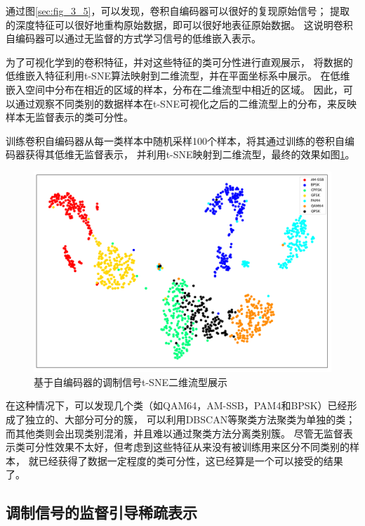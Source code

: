 通过图\ref{sec:fig_3_5}，可以发现，卷积自编码器可以很好的复现原始信号；
提取的深度特征可以很好地重构原始数据，即可以很好地表征原始数据。
这说明卷积自编码器可以通过无监督的方式学习信号的低维嵌入表示。\par

为了可视化学到的卷积特征，并对这些特征的类可分性进行直观展示，
将数据的低维嵌入特征利用t-SNE算法映射到二维流型，并在平面坐标系中展示。
在低维嵌入空间中分布在相近的区域的样本，分布在二维流型中相近的区域。
因此，可以通过观察不同类别的数据样本在t-SNE可视化之后的二维流型上的分布，来反映样本无监督表示的类可分性。\par

训练卷积自编码器从每一类样本中随机采样100个样本，将其通过训练的卷积自编码器获得其低维无监督表示，
并利用t-SNE映射到二维流型，最终的效果如图\ref{sec:fig_3_6}。

\begin{figure}[!h]
	\centering
	\includegraphics[scale=0.4]{figures/chapter_3/fig_3_6}
	\caption{基于自编码器的调制信号t-SNE二维流型展示}	\label{sec:fig_3_6}
\end{figure}

在这种情况下，可以发现几个类（如QAM64，AM-SSB，PAM4和BPSK）已经形成了独立的、大部分可分的簇，
可以利用DBSCAN等聚类方法聚类为单独的类；而其他类则会出现类别混淆，并且难以通过聚类方法分离类别簇。 
尽管无监督表示类可分性效果不太好，但考虑到这些特征从来没有被训练用来区分不同类别的样本，
就已经获得了数据一定程度的类可分性，这已经算是一个可以接受的结果了。 \par 

\subsection{调制信号的监督引导稀疏表示}

